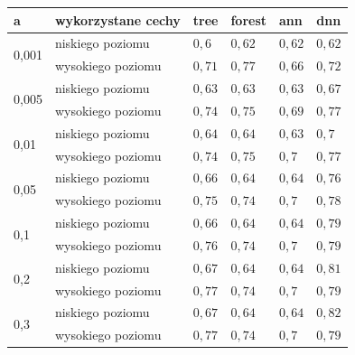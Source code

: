 \begin{table}[]
\centering
\begin{tabular}{|l|l|l|l|l|l|}
\hline
a                      & wykorzystane cechy       & tree & forest & ann & dnn \\ \hline

\multirow{2}{*}{0,001} & niskiego poziomu   & $ 0,6 $ & $ 0,62 $ & $ 0,62 $ &$ 0,62 $ \\ \cline{2-6} 
                       & wysokiego poziomu & $ 0,71 $ & $ 0,77 $ & $ 0,66 $ &$ 0,72 $ \\ \hline
                       
\multirow{2}{*}{0,005} & niskiego poziomu  & $ 0,63 $ & $ 0,63 $ & $ 0,63 $ &$ 0,67 $ \\ \cline{2-6} 
                       & wysokiego poziomu & $ 0,74 $ & $ 0,75 $ & $ 0,69 $ &$ 0,77 $ \\ \hline
                       
\multirow{2}{*}{0,01}  & niskiego poziomu  & $ 0,64 $ & $ 0,64 $ & $ 0,63 $ &$ 0,7 $ \\ \cline{2-6} 
                       & wysokiego poziomu & $ 0,74 $ & $ 0,75 $ & $ 0,7 $ &$ 0,77 $ \\ \hline
                       
\multirow{2}{*}{0,05}  & niskiego poziomu  & $ 0,66 $ & $ 0,64 $ & $ 0,64 $ &$ 0,76 $ \\ \cline{2-6} 
                       & wysokiego poziomu &  $ 0,75 $ & $ 0,74 $ & $ 0,7 $ &$ 0,78 $ \\ \hline
                       
\multirow{2}{*}{0,1}   & niskiego poziomu  &  $ 0,66 $ & $ 0,64 $ & $ 0,64 $ &$ 0,79 $ \\ \cline{2-6} 
                       & wysokiego poziomu &  $ 0,76 $ & $ 0,74 $ & $ 0,7 $ &$ 0,79 $ \\ \hline
                       
\multirow{2}{*}{0,2}   & niskiego poziomu  &  $ 0,67 $ & $ 0,64 $ & $ 0,64 $ &$ 0,81 $ \\ \cline{2-6} 
                       & wysokiego poziomu &  $ 0,77 $ & $ 0,74 $ & $ 0,7 $ &$ 0,79 $ \\ \hline
                       
\multirow{2}{*}{0,3}   & niskiego poziomu  &  $ 0,67 $ & $ 0,64 $ & $ 0,64 $ &$ 0,82 $ \\ \cline{2-6} 
                       & wysokiego poziomu &  $ 0,77 $ & $ 0,74 $ & $ 0,7 $ &$ 0,79 $ \\ \hline
                       

\end{tabular}
\end{table}
